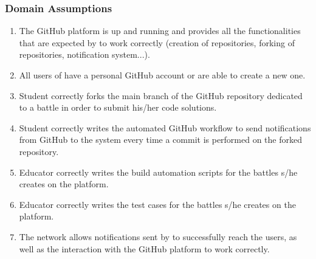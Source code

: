 \subsubsection{Domain Assumptions}
\begin{enumerate}[label=D\arabic*]
		\item The GitHub platform is up and running and provides all the functionalities that are expected by \app to work correctly (creation of repositories, forking of repositories, notification system...).
		\item All users of \app have a personal GitHub account or are able to create a new one.
		\item Student correctly forks the main branch of the GitHub repository dedicated to a battle in order to submit his/her code solutions.
		\item Student correctly writes the automated GitHub workflow to send notifications from GitHub to the system every time a commit is performed on the forked repository.
		\item Educator correctly writes the build automation scripts for the battles s/he creates on the platform.
		\item Educator correctly writes the test cases for the battles s/he creates on the platform.
		\item The network allows notifications sent by \app to successfully reach the users, as well as the interaction with the GitHub platform to work correctly.
	\end{enumerate}